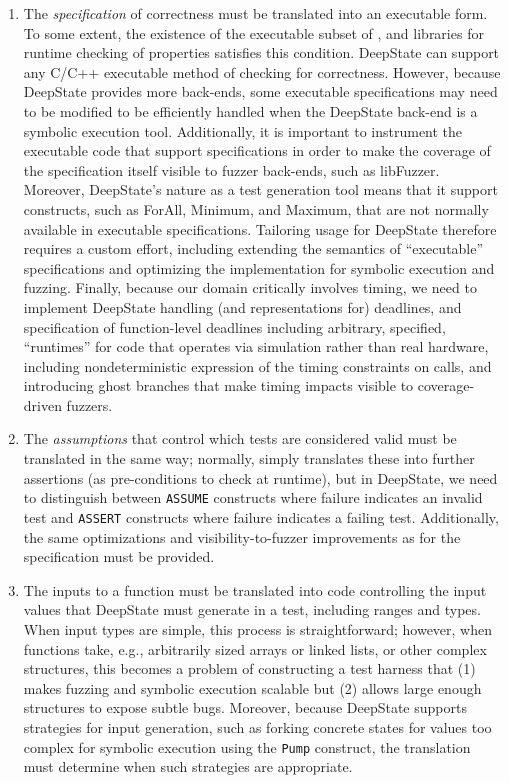 \begin{enumerate}[labelsep=3pt,leftmargin=12pt]
\item The \emph{specification} of correctness must be translated into an executable form.  To some extent, the existence of the \eacsl executable subset of \acsl, and libraries for runtime checking of properties satisfies this condition.  DeepState can support any C/C++ executable method of checking for correctness.  However, because DeepState provides more back-ends, some executable specifications may need to be modified to be efficiently handled when the DeepState back-end is a symbolic execution tool.  Additionally, it is important to instrument the executable code that support specifications in order to make the coverage of the specification itself visible to fuzzer back-ends, such as libFuzzer.  Moreover, DeepState's nature as a test generation tool means that it support constructs, such as ForAll, Minimum, and Maximum, that are not normally available in executable specifications.  Tailoring \eacsl usage for DeepState therefore requires a custom effort, including extending the semantics of ``executable'' specifications and optimizing the implementation for symbolic execution and fuzzing.  Finally, because our domain critically involves timing, we need to implement DeepState handling (and \eacsl representations for) deadlines, and specification of function-level deadlines including arbitrary, specified, ``runtimes'' for code that operates via simulation rather than real hardware, including nondeterministic expression of the timing constraints on calls, and introducing ghost branches that make timing impacts visible to coverage-driven fuzzers.
\item The \emph{assumptions} that control which tests are considered valid must be translated in the same way; normally, \eacsl simply translates these into further assertions (as pre-conditions to check at runtime), but in DeepState, we need to distinguish between {\tt ASSUME} constructs where failure indicates an invalid test and {\tt ASSERT} constructs where failure indicates a failing test.  Additionally, the same optimizations and visibility-to-fuzzer improvements as for the specification must be provided.
\item The inputs to a function must be translated into code controlling the input values that DeepState must generate in a test, including ranges and types.  When input types are simple, this process is straightforward; however, when functions take, e.g., arbitrarily sized arrays or linked lists, or other complex structures, this becomes a problem of constructing a test harness that (1) makes fuzzing and symbolic execution scalable but (2) allows large enough structures to expose subtle bugs.  Moreover, because DeepState supports strategies for input generation, such as forking concrete states for values too complex for symbolic execution using the {\tt Pump} construct, the translation must determine when such strategies are appropriate.

\end{enumerate}
